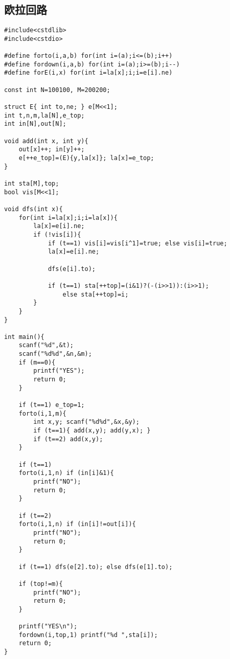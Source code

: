 \documentclass{article}
\begin{document}
\subsection{欧拉回路}
\begin{lstlisting}
#include<cstdlib>
#include<cstdio>

#define forto(i,a,b) for(int i=(a);i<=(b);i++)
#define fordown(i,a,b) for(int i=(a);i>=(b);i--)
#define forE(i,x) for(int i=la[x];i;i=e[i].ne)

const int N=100100, M=200200;

struct E{ int to,ne; } e[M<<1];
int t,n,m,la[N],e_top;
int in[N],out[N];

void add(int x, int y){
	out[x]++; in[y]++;
	e[++e_top]=(E){y,la[x]}; la[x]=e_top;
}

int sta[M],top;
bool vis[M<<1];

void dfs(int x){
	for(int i=la[x];i;i=la[x]){
		la[x]=e[i].ne;
		if (!vis[i]){
			if (t==1) vis[i]=vis[i^1]=true; else vis[i]=true;
			la[x]=e[i].ne;
		
			dfs(e[i].to);
		
			if (t==1) sta[++top]=(i&1)?(-(i>>1)):(i>>1);
				else sta[++top]=i;
		}
	}
}

int main(){
	scanf("%d",&t);
	scanf("%d%d",&n,&m);
	if (m==0){
		printf("YES");
		return 0;
	}
	
	if (t==1) e_top=1;
	forto(i,1,m){
		int x,y; scanf("%d%d",&x,&y);
		if (t==1){ add(x,y); add(y,x); }
		if (t==2) add(x,y);
	}
	
	if (t==1)
	forto(i,1,n) if (in[i]&1){
		printf("NO");
		return 0;
	}
	
	if (t==2)
	forto(i,1,n) if (in[i]!=out[i]){
		printf("NO");
		return 0;
	}
	
	if (t==1) dfs(e[2].to); else dfs(e[1].to);
	
	if (top!=m){
		printf("NO");
		return 0;
	}
	
	printf("YES\n");
	fordown(i,top,1) printf("%d ",sta[i]);
	return 0;
}
\end{lstlisting}
\end{document}
